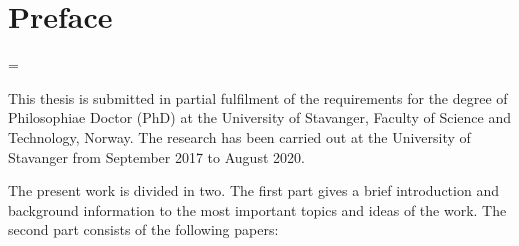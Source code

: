 \chapter*{Preface}

\emergencystretch=\maxdimen
{}

This thesis is submitted in partial fulfilment of the requirements for the degree of Philosophiae Doctor (PhD) at the University of Stavanger, Faculty of Science and Technology, Norway. The research has been carried out at the University of Stavanger from September 2017 to August 2020.

The present work is divided in two. The first part gives a brief introduction and background information to the most important topics and ideas of the work. The second part consists of the following papers:




